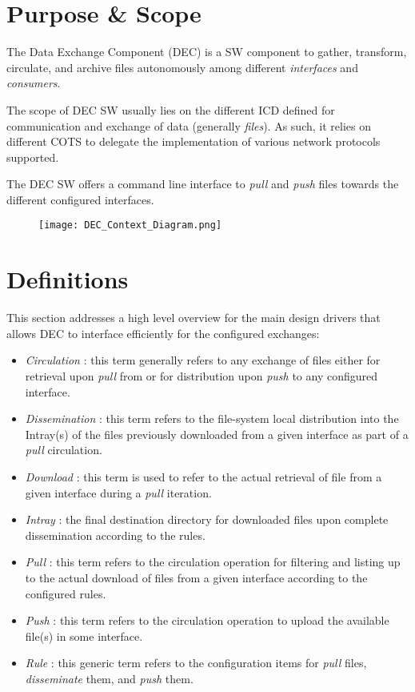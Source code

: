 \documentclass[dec_sum_main.tex]{subfiles}
\begin{document}
\section{Purpose \& Scope}
The Data Exchange Component (DEC) is a SW component to gather, transform, circulate, and archive files autonomously among different \textit{interfaces} and \textit{consumers}. \newline
\par
\noindent
The scope of DEC SW usually lies on the different ICD defined for communication and exchange of data (generally \textit{files}). As such, it relies on different COTS to delegate the implementation of various network protocols supported.\newline
\par
\noindent
The DEC SW offers a command line interface to \textit{pull} and \textit{push} files towards the different configured interfaces.

\begin{figure}[hbt!]
	\centering
	\texttt{[image: DEC\_Context\_Diagram.png]}
\end{figure}

\section{Definitions}
This section addresses a high level overview for the main design drivers that allows DEC to interface efficiently for the configured exchanges:

\begin{itemize}
	\item \textit{Circulation} : this term generally refers to any exchange of files either for retrieval upon \textit{pull} from or for distribution upon \textit{push} to any configured interface.
	\item \textit{Dissemination} : this term refers to the file-system local distribution into the Intray(s) of the files previously downloaded from a given interface as part of a \textit{pull} circulation.
	\item \textit{Download} : this term is used to refer to the actual retrieval of file from a given interface during a \textit{pull} iteration.
	\item \textit{Intray} : the final destination directory for downloaded files upon complete dissemination according to the rules.
	\item \textit{Pull} : this term refers to the circulation operation for filtering and listing up to the actual download of files from a given interface according to the configured rules. 
	\item \textit{Push} : this term refers to the circulation operation to upload the available file(s) in some interface. 
	\item \textit{Rule} : this generic term refers to the configuration items for \textit{pull} files, \textit{disseminate} them, and \textit{push} them.
\end{itemize}
\end{document}
